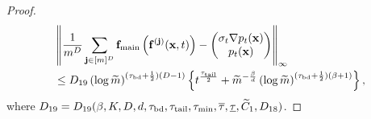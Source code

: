 \documentclass[twoside,11pt]{article}
\newcommand{\bff}{{\bf f}}
\newcommand{\bj}{{\bf j}}
\newcommand{\bx}{{\bf x}}
\newcommand{\be}{\begin{equation}}
\newcommand{\ee}{\end{equation}}
\begin{document}
\begin{proof}
\be \begin{split}
& \left\| \frac{1}{m^{D}} \sum_{\bj \in [m]^{D}} \bff_{\rm main}\left( \bff^{(\bj)}(\bx,t) \right) 
- \begin{pmatrix}
\sigma_t  \nabla p_t(\bx)
\\
  p_t(\bx)
\end{pmatrix}
\right\|_{\infty}
\\
& \leq D_{19} \left( \log \widetilde m \right)^{(\tau_{\rm bd}+\frac{1}{2}) (D-1)  } \left\{
t^{\frac{\tau_{\rm tail}}{2}} + \widetilde m^{-\frac{\beta}{d}} \left( \log \widetilde m \right)^{(\tau_{\rm bd}+\frac{1}{2})(\beta + 1 )} \right\}, \label{eqthm1:error}
\end{split} \ee
where $D_{19} = D_{19}(\beta, K, D, d, \tau_{\rm bd}, \tau_{\rm tail}, 
\tau_{\rm min}, \overline{\tau}, \underline{\tau}, \widetilde C_{1}, D_{18})$.


\end{proof}
\end{document}
